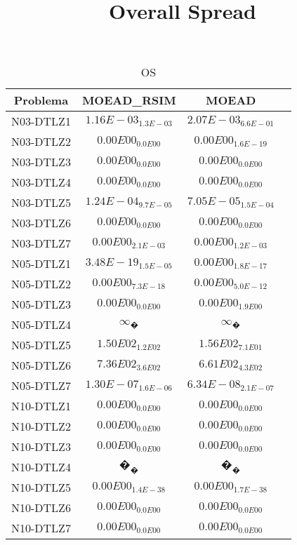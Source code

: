 \documentclass{article}
\title{Overall Spread}
\author{}
\begin{document}
\maketitle
\begin{table*}[ht!]
\scriptsize
\caption{OS}
\centering\begin{tabular}{|c||c||c||c|} \hline
Problema &MOEAD_RSIM &MOEAD\\\hline
N03-DTLZ1 &\cellcolor{gray25}$1.16E-03_{1.3E-03}$ &\cellcolor{gray95}$2.07E-03_{6.6E-01}$\\ 
\hline
N03-DTLZ2 &\cellcolor{gray95}$0.00E00_{0.0E00}$ &\cellcolor{gray25}$0.00E00_{1.6E-19}$\\ 
\hline
N03-DTLZ3 &\cellcolor{gray95}$0.00E00_{0.0E00}$ &\cellcolor{gray25}$0.00E00_{0.0E00}$\\ 
\hline
N03-DTLZ4 &\cellcolor{gray95}$0.00E00_{0.0E00}$ &\cellcolor{gray25}$0.00E00_{0.0E00}$\\ 
\hline
N03-DTLZ5 &\cellcolor{gray95}$1.24E-04_{9.7E-05}$ &\cellcolor{gray25}$7.05E-05_{1.5E-04}$\\ 
\hline
N03-DTLZ6 &\cellcolor{gray95}$0.00E00_{0.0E00}$ &\cellcolor{gray25}$0.00E00_{0.0E00}$\\ 
\hline
N03-DTLZ7 &\cellcolor{gray25}$0.00E00_{2.1E-03}$ &\cellcolor{gray95}$0.00E00_{1.2E-03}$\\ 
\hline
N05-DTLZ1 &\cellcolor{gray95}$3.48E-19_{1.5E-05}$ &\cellcolor{gray25}$0.00E00_{1.8E-17}$\\ 
\hline
N05-DTLZ2 &\cellcolor{gray95}$0.00E00_{7.3E-18}$ &\cellcolor{gray25}$0.00E00_{5.0E-12}$\\ 
\hline
N05-DTLZ3 &\cellcolor{gray95}$0.00E00_{0.0E00}$ &\cellcolor{gray25}$0.00E00_{1.9E00}$\\ 
\hline
N05-DTLZ4 &\cellcolor{gray95}$∞_{�}$ &\cellcolor{gray25}$∞_{�}$\\ 
\hline
N05-DTLZ5 &\cellcolor{gray25}$1.50E02_{1.2E02}$ &\cellcolor{gray95}$1.56E02_{7.1E01}$\\ 
\hline
N05-DTLZ6 &\cellcolor{gray95}$7.36E02_{3.6E02}$ &\cellcolor{gray25}$6.61E02_{4.3E02}$\\ 
\hline
N05-DTLZ7 &\cellcolor{gray95}$1.30E-07_{1.6E-06}$ &\cellcolor{gray25}$6.34E-08_{2.1E-07}$\\ 
\hline
N10-DTLZ1 &\cellcolor{gray95}$0.00E00_{0.0E00}$ &\cellcolor{gray25}$0.00E00_{0.0E00}$\\ 
\hline
N10-DTLZ2 &\cellcolor{gray95}$0.00E00_{0.0E00}$ &\cellcolor{gray25}$0.00E00_{0.0E00}$\\ 
\hline
N10-DTLZ3 &\cellcolor{gray95}$0.00E00_{0.0E00}$ &\cellcolor{gray25}$0.00E00_{0.0E00}$\\ 
\hline
N10-DTLZ4 &\cellcolor{gray25}$�_{�}$ &$�_{�}$\\ 
\hline
N10-DTLZ5 &\cellcolor{gray95}$0.00E00_{1.4E-38}$ &\cellcolor{gray25}$0.00E00_{1.7E-38}$\\ 
\hline
N10-DTLZ6 &\cellcolor{gray95}$0.00E00_{0.0E00}$ &\cellcolor{gray25}$0.00E00_{0.0E00}$\\ 
\hline
N10-DTLZ7 &\cellcolor{gray95}$0.00E00_{0.0E00}$ &\cellcolor{gray25}$0.00E00_{0.0E00}$\\ 
\hline
\end{tabular}
\end{table*}
\end{document}
